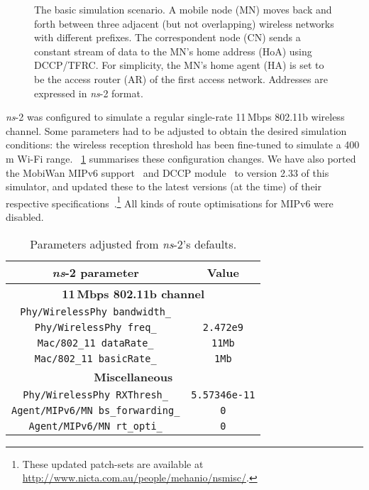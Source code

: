 \documentclass[twocolumn]{nictatechreport}
\newcommand{\ns}{\textit{ns}}
\begin{document}
\begin{figure}[tb]
  \caption[DCCP/TFRC mobility simulation scenario]{The basic simulation
  scenario. A mobile node (MN) moves back and forth between three adjacent (but
  not overlapping) wireless networks with different prefixes. The correspondent
  node (CN) sends a constant stream of data to the MN's home address (HoA) using
  DCCP/TFRC. For simplicity, the MN's home agent (HA) is set to be the access
  router (AR) of the first access network.  Addresses are expressed in \ns-2
  format.}

  \label{fig:systematic_simulation}
\end{figure}

\ns-2 was configured to simulate a regular single-rate 11\,Mbps 802.11b wireless
channel. Some parameters had to be adjusted to obtain the desired simulation
conditions: the wireless reception threshold has been fine-tuned to simulate a
400\,m Wi-Fi range. \tablename~\ref{tab:ns80211} summarises these configuration
changes.  We have also ported the MobiWan MIPv6 support~\cite{2001ernst_mobiwan}
and DCCP module~\cite{2004mattsson_dccp_ns2} to version 2.33 of this simulator,
and updated these to the latest versions (at the time) of their respective
specifications~\cite{rfc3775,rfc5348}.\footnote{These updated patch-sets are
available at \url{http://www.nicta.com.au/people/mehanio/nsmisc/}.} All kinds of
route optimisations for MIPv6 were disabled.

\begin{table}[tb]
  \centering

  \caption[Simulations parameters adjusted from \ns-2's defaults]{Parameters
  adjusted from \ns-2's defaults.}

  \label{tab:ns80211}
  \begin{tabular}{cc}
    \toprule
    \textbf{\ns-2 parameter} & \textbf{Value} \\
    \midrule
    \multicolumn{2}{c}{\textbf{11\,Mbps 802.11b channel}} \\
    \midrule
    \verb#Phy/WirelessPhy bandwidth_# & \verb#11Mb# \\
    \verb#Phy/WirelessPhy freq_# & \verb_2.472e9_ \\
    \verb#Mac/802_11 dataRate_# & \verb_11Mb_ \\
    \verb#Mac/802_11 basicRate_# & \verb_1Mb_ \\
    \midrule
    \multicolumn{2}{c}{\textbf{Miscellaneous}} \\
    \midrule
    \verb#Phy/WirelessPhy RXThresh_# & \verb_5.57346e-11_ \\
    \verb#Agent/MIPv6/MN bs_forwarding_# & \verb_0_ \\
    \verb#Agent/MIPv6/MN rt_opti_# & \verb_0_ \\
    \bottomrule
  \end{tabular}
\end{table}
\end{document}
